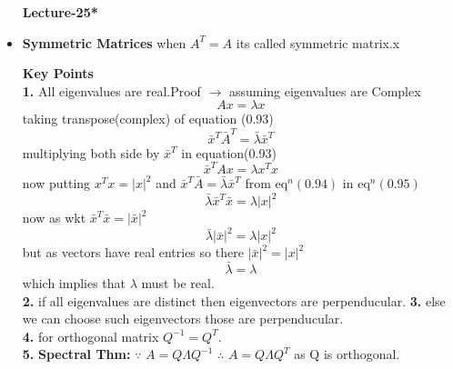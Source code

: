 \documentclass[a4paper,11pt]{article}
\numberwithin{equation}{section}
\begin{document}
\begin{itemize}
\begin{center}
    \Huge{\textbf{Lecture-25*}}
\end{center}
\vspace{5pt}

\item \textbf{Symmetric Matrices} when $A^T=A$ its called symmetric matrix.x

\textbf{Key Points}\\

\textbf{1.} All eigenvalues are real.Proof $\rightarrow$ assuming eigenvalues are Complex
\begin{equation}
    A{x}=\lambda {x} 
\end{equation}
taking transpose(complex) of equation (0.93)
\begin{equation}
    {\bar{x}}^T\bar{A}^T=\bar{\lambda} {\bar{x}}^T
\end{equation}
multiplying both side by ${\bar{x}}^T$ in equation(0.93)
\begin{equation}
    {\bar{x}}^TA{x}=\lambda {{x}}^T{x}
\end{equation}
now putting ${{x}}^T{x}=\vert {x}\vert^2$ and ${\bar{x}}^T\bar{A}=\bar{\lambda} {\bar{x}}^T$ from eq$^n(0.94)$ in eq$^n(0.95)$
\begin{equation}
    \bar{\lambda} {\bar{x}}^T\bar{x}=\lambda \vert {x}\vert^2
\end{equation}
now as wkt ${{\bar{x}}}^T{\bar{x}}=\vert {\bar{x}}\vert^2$
\begin{equation}
    \bar{\lambda} \vert {\bar{x}}\vert^2=\lambda \vert {x}\vert^2
\end{equation}
but as vectors have real entries so there $\vert {\bar{x}}\vert^2=\vert {{x}}\vert^2$
\begin{equation}
    \bar{\lambda}=\lambda
\end{equation}
which implies that $\lambda$ must be real.\\

\textbf{2.} if all eigenvalues are distinct then eigenvectors are perpenducular.
\textbf{3.} else we can choose such eigenvectors those are perpenducular.\\

\textbf{4.} for orthogonal matrix $Q^{-1}=Q^T$.\\
\textbf{5.} \textbf{Spectral Thm: }$\because$ $A=Q\varLambda Q^{-1}$ $\therefore$ $A=Q\varLambda Q^T$ as Q is orthogonal.\\


\end{itemize}
\end{document}
